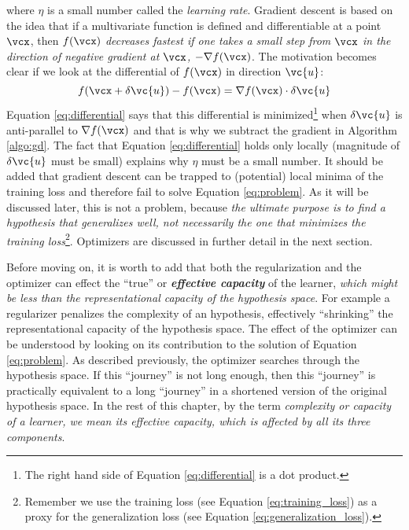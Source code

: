 \noindent where $\eta$ is a small number called the \emph{learning
rate}. Gradient descent is based on the idea that
if a multivariate function is defined and differentiable at a point $\vcx$, then
$f(\vcx)$ \emph{decreases fastest if one takes a small step from $\vcx$ in the
direction of negative gradient at $\vcx$, $-\nabla f(\vcx)$}. The motivation
becomes clear if we look at the differential of $f(\vcx)$ in direction $\vc{u}$:
\begin{equation}
	\label{eq:differential}
	f(\vcx + \delta \vc{u}) - f(\vcx) = \nabla f(\vcx) \cdot \delta \vc{u}
\end{equation}
Equation \ref{eq:differential} says that this differential is
minimized\footnote{The right hand side of Equation \ref{eq:differential} is a
dot product.} when $\delta \vc{u}$ is anti-parallel to $\nabla f(\vcx)$ and that
is why we subtract the gradient in Algorithm \ref{algo:gd}. The fact that
Equation \ref{eq:differential} holds only locally (magnitude of $\delta \vc{u}$
must be small) explains why $\eta$ must be a small number. It should be added
that gradient descent can be trapped to (potential) local minima of the training
loss and therefore fail to solve Equation \ref{eq:problem}. As it will be
discussed later, this is not a problem, because \emph{the ultimate purpose is to
find a hypothesis that generalizes well, not necessarily the one that minimizes
the training loss}\footnote{Remember we use the training loss (see Equation
\ref{eq:training_loss}) as a proxy for the generalization loss (see Equation
\ref{eq:generalization_loss}).}. Optimizers are discussed in further detail in
the next section.

Before moving on, it is worth to add that both the regularization and the
optimizer can effect the ``true'' or \emph{\textbf{effective
capacity}} \parencite{deeplearning} of the learner,
\emph{which might be less than the representational
capacity of the hypothesis space}. For example
a regularizer penalizes the complexity of an hypothesis, effectively
``shrinking'' the representational capacity of the hypothesis space. The effect
of the optimizer can be understood by looking on its contribution to the
solution of Equation \ref{eq:problem}. As described previously, the optimizer
searches through the hypothesis space. If this ``journey'' is not long enough,
then this ``journey'' is practically equivalent to a long ``journey'' in a
shortened version of the original hypothesis space. In the rest of this chapter,
by the term \emph{complexity or capacity of a
learner, we mean its effective capacity, which is affected by all its three
components}.

